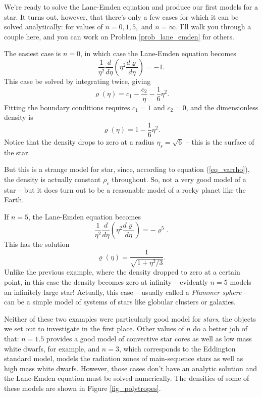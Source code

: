 We're ready to solve the Lane-Emden equation and produce our first models for a star.  It turns out, however, that there's only a few cases for which it can be solved analytically:  for values of $n = 0, 1, 5,$ and $n = \infty$.  I'll walk you through a couple here, and you can work on Problem \ref{prob_lane_emden} for others.

\begin{example}[n = 0]
The easiest case is $n = 0$, in which case the Lane-Emden equation becomes
\[
\frac{1}{\eta^2} \frac{d}{d\eta} \left( \eta^2 \frac{d\varrho}{d\eta} \right) = -1.
\]
This case be solved by integrating twice, giving
\[
\varrho(\eta) = c_1 - \frac{c_2}{\eta} - \frac{1}{6} \eta^2.
\]
Fitting the boundary conditions requires $c_1 = 1$ and $c_2 = 0$, and the dimensionless density is
\[
\varrho(\eta) = 1 - \frac{1}{6} \eta^2.
\]
Notice that the density drops to zero at a radius $\eta_s = \sqrt{6}$ -- this is the surface of the star.  

But this is a strange model for star, since, according to equation (\ref{eq_varrho}), the density is actually constant $\rho_c$ throughout.  So, not a very good model of a star -- but it does turn out to be a reasonable model of a rocky planet like the Earth.
\end{example}

\begin{example}[n = 5]
If $n = 5$, the Lane-Emden equation becomes
\[
\frac{1}{\eta^2} \frac{d}{d\eta} \left( \eta^2 \frac{d\varrho}{d\eta} \right) = -\varrho^5.
\]
This has the solution
\[
\varrho(\eta) = \frac{1}{\sqrt{1 + \eta^2/3}}.
\]
Unlike the previous example, where the density dropped to zero at a certain point, in this case the density becomes zero at infinity -- evidently $n=5$ models an infinitely large star!  Actually, this case -- usually called a \emph{Plummer sphere} -- can be a simple model of systems of stars like globular clusters or galaxies.
\end{example}

Neither of these two examples were particularly good model for \emph{stars}, the objects we set out to investigate in the first place.  Other values of $n$ do a better job of that:  $n = 1.5$ provides a good model of convective star cores as well as low mass white dwarfs, for example, and $n = 3$, which corresponds to the Eddington standard model, models the radiation zones of main-sequence stars as well as high mass white dwarfs.  However, those cases don't have an analytic solution and the Lane-Emden equation must be solved numerically.  The densities of some of these models are shown in Figure \ref{fig_polytropes}.

